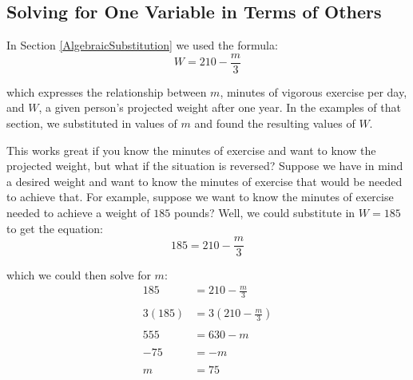 
%
%

\subsection{Solving for One Variable in Terms of Others}

In Section \ref{AlgebraicSubstitution} we used the formula:
$$W=210-\frac{m}{3}$$

which expresses the relationship between $m$, minutes of vigorous exercise per day, and $W$, a given person’s projected weight after one year. In the examples of that section, we substituted in values of $m$ and found the resulting values of $W$.

This works great if you know the minutes of exercise and want to know the projected weight, but what if the situation is reversed? Suppose we have in mind a desired weight and want to know the minutes of exercise that would be needed to achieve that. For example, suppose we want to know the minutes of exercise needed to achieve a weight of $185$ pounds? Well, we could substitute in $W=185$ to get the equation:
$$185=210-\frac{m}{3}$$

which we could then solve for $m$:
\begin{align*}
	185&=210-\frac{m}{3} \\
	\\
	3(185) &= 3 \left(210 - \frac{m}{3}\right) \\
	\\
	555 &= 630 - m \\
	\\
	-75 &= -m \\
	\\
	m &= 75
\end{align*}

